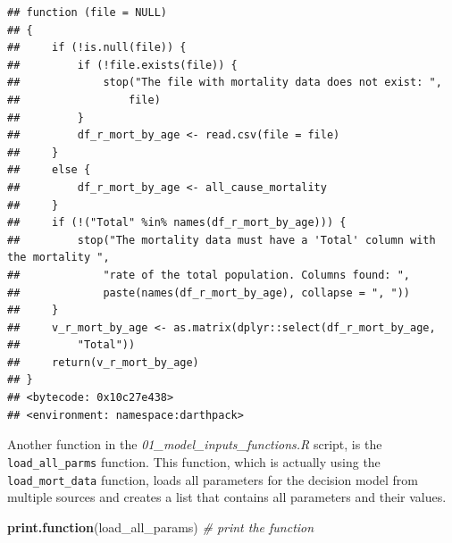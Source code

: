 \documentclass[
]{book}
\newenvironment{Shaded}{\begin{snugshade}}{\end{snugshade}}
\newcommand{\CommentTok}[1]{\textcolor[rgb]{0.56,0.35,0.01}{\textit{#1}}}
\newcommand{\FunctionTok}[1]{\textcolor[rgb]{0.13,0.29,0.53}{\textbf{#1}}}
\newcommand{\NormalTok}[1]{#1}
\begin{document}
\begin{verbatim}
## function (file = NULL) 
## {
##     if (!is.null(file)) {
##         if (!file.exists(file)) {
##             stop("The file with mortality data does not exist: ", 
##                 file)
##         }
##         df_r_mort_by_age <- read.csv(file = file)
##     }
##     else {
##         df_r_mort_by_age <- all_cause_mortality
##     }
##     if (!("Total" %in% names(df_r_mort_by_age))) {
##         stop("The mortality data must have a 'Total' column with the mortality ", 
##             "rate of the total population. Columns found: ", 
##             paste(names(df_r_mort_by_age), collapse = ", "))
##     }
##     v_r_mort_by_age <- as.matrix(dplyr::select(df_r_mort_by_age, 
##         "Total"))
##     return(v_r_mort_by_age)
## }
## <bytecode: 0x10c27e438>
## <environment: namespace:darthpack>
\end{verbatim}

Another function in the \emph{01\_model\_inputs\_functions.R} script, is the \texttt{load\_all\_parms} function. This function, which is actually using the \texttt{load\_mort\_data} function, loads all parameters for the decision model from multiple sources and creates a list that contains all parameters and their values.

\begin{Shaded}
\begin{Highlighting}[]
\FunctionTok{print.function}\NormalTok{(load\_all\_params)  }\CommentTok{\# print the function}
\end{Highlighting}
\end{Shaded}
\end{document}

